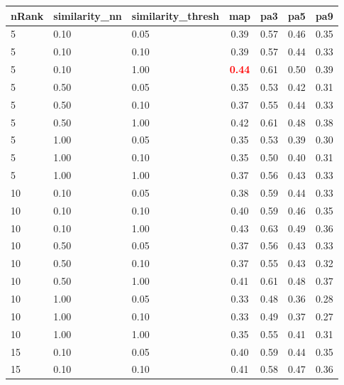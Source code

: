 \documentclass[12pt,a4paper,fleqn]{tufte-handout}
\begin{document}
 
\begin{table}                   
\begin{center}                   
\scriptsize                   
\setlength{\tabcolsep}{.16667em}                   
\begin{tabular}{lllcccc}                   
nRank & similarity\_nn & similarity\_thresh & map & pa3 & pa5 & pa9 \\                   
\hline                   
5 & 0.10 & 0.05 & 0.39 & 0.57 & 0.46 & 0.35 \\                   
5 & 0.10 & 0.10 & 0.39 & 0.57 & 0.44 & 0.33 \\                   
5 & 0.10 & 1.00 & \textbf{\textcolor{red}{0.44}} & 0.61 & 0.50 & 0.39 \\                   
5 & 0.50 & 0.05 & 0.35 & 0.53 & 0.42 & 0.31 \\                   
5 & 0.50 & 0.10 & 0.37 & 0.55 & 0.44 & 0.33 \\                   
5 & 0.50 & 1.00 & 0.42 & 0.61 & 0.48 & 0.38 \\                   
5 & 1.00 & 0.05 & 0.35 & 0.53 & 0.39 & 0.30 \\                   
5 & 1.00 & 0.10 & 0.35 & 0.50 & 0.40 & 0.31 \\                   
5 & 1.00 & 1.00 & 0.37 & 0.56 & 0.43 & 0.33 \\                   
10 & 0.10 & 0.05 & 0.38 & 0.59 & 0.44 & 0.33 \\                   
10 & 0.10 & 0.10 & 0.40 & 0.59 & 0.46 & 0.35 \\                   
10 & 0.10 & 1.00 & 0.43 & 0.63 & 0.49 & 0.36 \\                   
10 & 0.50 & 0.05 & 0.37 & 0.56 & 0.43 & 0.33 \\                   
10 & 0.50 & 0.10 & 0.37 & 0.55 & 0.43 & 0.32 \\                   
10 & 0.50 & 1.00 & 0.41 & 0.61 & 0.48 & 0.37 \\                   
10 & 1.00 & 0.05 & 0.33 & 0.48 & 0.36 & 0.28 \\                   
10 & 1.00 & 0.10 & 0.33 & 0.49 & 0.37 & 0.27 \\                   
10 & 1.00 & 1.00 & 0.35 & 0.55 & 0.41 & 0.31 \\                   
15 & 0.10 & 0.05 & 0.40 & 0.59 & 0.44 & 0.35 \\                   
15 & 0.10 & 0.10 & 0.41 & 0.58 & 0.47 & 0.36 \\                   

\end{tabular}
\end{center}
\end{table}
\end{document}
